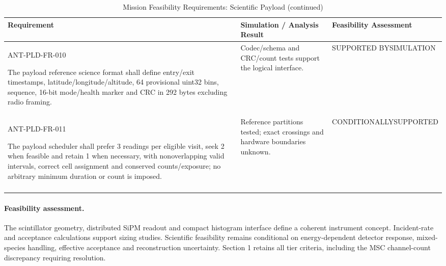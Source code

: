 \begin{table}[H]\centering\small\setlength{\tabcolsep}{3pt}
\ContinuedFloat\captionsetup{list=no}
\caption{Mission Feasibility Requirements: Scientific Payload (continued)}
\begin{tabular}{@{}
>{\RaggedRight\arraybackslash}p{}
>{\RaggedRight\arraybackslash}p{}
>{\RaggedRight\arraybackslash}p{}
@{}}
\toprule Requirement & Simulation / Analysis Result & Feasibility Assessment\\\midrule
{}\label{req:ANT-PLD-FR-010}\mbox{ANT-PLD-}\newline\mbox{FR-010}\par The payload reference science format shall define entry/exit timestamps, latitude/longitude/altitude, 64 provisional uint32 bins, sequence, 16-bit mode/health marker and CRC in 292 bytes excluding radio framing. & Codec/schema and CRC/count tests support the logical interface. & SUPPORTED BY\newline SIMULATION\\
\addlinespace[3pt]
\label{req:ANT-PLD-FR-011}\mbox{ANT-PLD-}\newline\mbox{FR-011}\par The payload scheduler shall prefer 3 readings per eligible visit, seek 2 when feasible and retain 1 when necessary, with nonoverlapping valid intervals, correct cell assignment and conserved counts/exposure; no arbitrary minimum duration or count is imposed. & Reference partitions tested; exact crossings and hardware boundaries unknown. & CONDITIONALLY\newline SUPPORTED\\
\addlinespace[3pt]
\bottomrule
\end{tabular}
\end{table}
\paragraph{Feasibility assessment.} The scintillator geometry, distributed SiPM readout and compact histogram interface define a coherent instrument concept. Incident-rate and acceptance calculations support sizing studies. Scientific feasibility remains conditional on energy-dependent detector response, mixed-species handling, effective acceptance and reconstruction uncertainty. Section 1 retains all tier criteria, including the MSC channel-count discrepancy requiring resolution.
